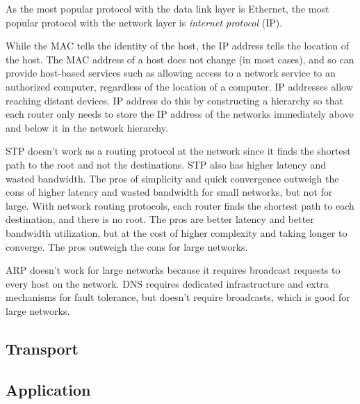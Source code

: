 As the most popular protocol with the
data link layer is Ethernet, the most
popular protocol with the network
layer is \emph{internet protocol}
(IP).

While the MAC tells the identity
of the host, the IP address tells
the location of the host. The MAC
address of a host does not change
(in most cases), and so can provide
host-based services such as allowing
access to a network service to an
authorized computer, regardless of
the location of a computer. IP
addresses allow reaching distant
devices. IP address do this by
constructing a hierarchy so that
each router only needs to store
the IP address of the networks
immediately above and below it
in the network hierarchy.

STP doesn't work as a routing
protocol at the network since
it finds the shortest path to
the root and not the destinations.
STP also has higher latency and
wasted bandwidth. The pros of
simplicity and quick convergence
outweigh the cons of higher
latency and wasted bandwidth
for small networks, but not for
large. With network routing
protocols, each router finds
the shortest path to each
destination, and there is no
root. The pros are better
latency and better bandwidth
utilization, but at the cost
of higher complexity and
taking longer to converge. The
pros outweigh the cons for
large networks.

ARP doesn't work for large networks
because it requires broadcast
requests to every host on the
network. DNS requires dedicated
infrastructure and extra mechanisms
for fault tolerance, but doesn't
require broadcasts, which is
good for large networks.

\subsection{Transport}

\subsection{Application}


